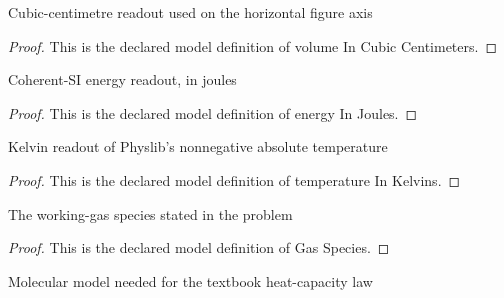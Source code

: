 \begin{definition}
  \label{def:physics:phyx-mini-0432:phyxminiproblems-problemphyxmini0432-volumeincubiccentimeters}
  Cubic-centimetre readout used on the horizontal figure axis
\end{definition}
\begin{proof}
  This is the declared model definition of volume In Cubic Centimeters.
\end{proof}
\begin{definition}
  \label{def:physics:phyx-mini-0432:phyxminiproblems-problemphyxmini0432-energyinjoules}
  Coherent-SI energy readout, in joules
\end{definition}
\begin{proof}
  This is the declared model definition of energy In Joules.
\end{proof}
\begin{definition}
  \label{def:physics:phyx-mini-0432:phyxminiproblems-problemphyxmini0432-temperatureinkelvins}
  Kelvin readout of Physlib's nonnegative absolute temperature
\end{definition}
\begin{proof}
  This is the declared model definition of temperature In Kelvins.
\end{proof}
\begin{definition}
  \label{def:physics:phyx-mini-0432:phyxminiproblems-problemphyxmini0432-gasspecies}
  The working-gas species stated in the problem
\end{definition}
\begin{proof}
  This is the declared model definition of Gas Species.
\end{proof}
\begin{definition}
  \label{def:physics:phyx-mini-0432:phyxminiproblems-problemphyxmini0432-gasmodel}
  Molecular model needed for the textbook heat-capacity law
\end{definition}
